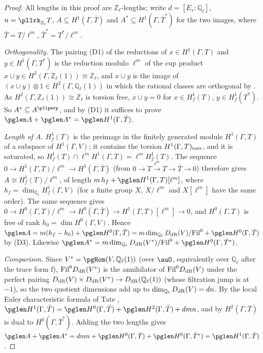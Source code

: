 \documentclass[10pt]{amsart}
\theoremstyle{definition}
\theoremstyle{remark}
\newcommand{\Z}{\mathbb Z}
\newcommand{\Q}{\mathbb Q}
\begin{document}
\begin{proof}
All lengths in this proof are $\Z_\ell$-lengths; write $d=[E_v:\Q_\ell]$, $n=\pllrk_{\Z_\ell}T$,
$A\subseteq H^1(\Gamma,\bar T)$ and $A^*\subseteq H^1(\Gamma,\bar T^*)$ for the two images, where
$\bar T=T/\ell^m$, $\bar T^*=T^*/\ell^m$.

\emph{Orthogonality.} The pairing (D1) of the reductions of $x\in H^1(\Gamma,T)$ and $y\in
H^1(\Gamma,T^*)$ is the reduction modulo $\ell^m$ of the cup product $x\cup y\in H^2(\Gamma,
\Z_\ell(1))\cong\Z_\ell$, and $x\cup y$ is the image of $(x\cup y)\otimes1\in H^2(\Gamma,\Q_\ell(1))$
in which the rational classes are orthogonal by \cite[Proposition~3.8]{BlochKato}. As
$H^2(\Gamma,\Z_\ell(1))\cong\Z_\ell$ is torsion free, $x\cup y=0$ for $x\in H^1_f(T)$, $y\in
H^1_f(T^*)$. So $A^*\subseteq A^{\pllperp}$, and by (D1) it suffices to prove
$\pglen A+\pglen A^*=\pglen H^1(\Gamma,\bar T)$.

\emph{Length of $A$.} $H^1_f(T)$ is the preimage in the finitely generated module $H^1(\Gamma,T)$
of a subspace of $H^1(\Gamma,V)$; it contains the torsion $H^1(\Gamma,T)_{\rm tors}$, and it is
saturated, so $H^1_f(T)\cap\ell^mH^1(\Gamma,T)=\ell^mH^1_f(T)$. The sequence
$0\to H^1(\Gamma,T)/\ell^m\to H^1(\Gamma,\bar T)$ (from $0\to T\xrightarrow{\ell^m}T\to\bar T\to0$)
therefore gives $A\cong H^1_f(T)/\ell^m$, of length $m\,h_f+\pglen H^1(\Gamma,T)[\ell^m]$, where
$h_f=\dim_{\Q_\ell}H^1_f(\Gamma,V)$ (for a finite group $X$, $X/\ell^m$ and $X[\ell^m]$ have the same
order). The same sequence gives $0\to H^0(\Gamma,T)/\ell^m\to H^0(\Gamma,\bar T)\to
H^1(\Gamma,T)[\ell^m]\to0$, and $H^0(\Gamma,T)$ is free of rank $h_0=\dim H^0(\Gamma,V)$. Hence
$\pglen A=m(h_f-h_0)+\pglen H^0(\Gamma,\bar T)=m\dim_{\Q_\ell}D_{\rm dR}(V)/\mathrm{Fil}^0+
\pglen H^0(\Gamma,\bar T)$ by (D3). Likewise $\pglen A^*=m\dim_{\Q_\ell}D_{\rm dR}(V^*)/\mathrm{Fil}^0
+\pglen H^0(\Gamma,\bar T^*)$.

\emph{Comparison.} Since $V^*=\pgHom(V,\Q_\ell(1))$ (over $\auO$, equivalently over $\Q_\ell$ after
the trace form $\mathrm f$), $\mathrm{Fil}^0D_{\rm dR}(V^*)$ is the annihilator of
$\mathrm{Fil}^0D_{\rm dR}(V)$ under the perfect pairing $D_{\rm dR}(V)\times D_{\rm dR}(V^*)\to
D_{\rm dR}(\Q_\ell(1))$ (whose filtration jump is at $-1$), so the two quotient dimensions add up to
$\dim_{\Q_\ell}D_{\rm dR}(V)=dn$. By the local Euler characteristic formula of Tate \cite[Theorem~7.3.1]{NSW},
$\pglen H^1(\Gamma,\bar T)=\pglen H^0(\Gamma,\bar T)+\pglen H^2(\Gamma,\bar T)+dmn$, and by
\cite[Theorem~7.2.6]{NSW} $H^2(\Gamma,\bar T)$ is dual to $H^0(\Gamma,\bar T^*)$. Adding the two
lengths gives $\pglen A+\pglen A^*=dmn+\pglen H^0(\Gamma,\bar T)+\pglen H^0(\Gamma,\bar T^*)=
\pglen H^1(\Gamma,\bar T)$.
\end{proof}
\end{document}
